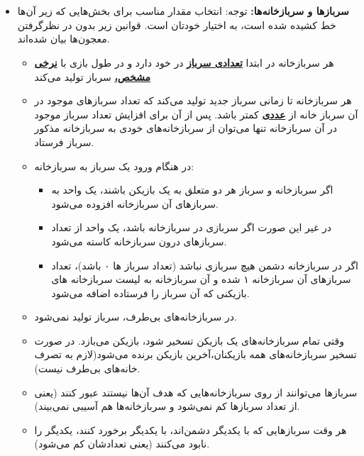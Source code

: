 \documentclass[]{article}
\begin{document}
\newpage

\section*{{}}
\begin{itemize}
    \item{ 
\textbf{سربازها و سربازخانه‌ها:
}
\newline
توجه: انتخاب مقدار مناسب برای بخش‌هایی که زیر آن‌ها خط کشیده شده است، به اختیار خودتان است.
قوانین زیر بدون در نظرگرفتن معجون‌ها بیان شده‌اند.

\begin{itemize}
    \item{
هر سربازخانه در ابتدا
\textbf{\underline{تعدادی سرباز}}
در خود دارد و در طول بازی با
\textbf{\underline{نرخی مشخص،}}
سرباز تولید می‌کند 
    }
    \item{
هر سربازخانه تا زمانی سرباز جدید تولید می‌کند که تعداد سرباز‌های موجود در آن سرباز خانه از
\textbf{\underline{عددی}}
کمتر باشد. پس از آن برای افزایش تعداد سرباز موجود در آن سربازخانه تنها ‌‌می‌توان از سربازخانه‌های خودی به سربازخانه مذکور سرباز فرستاد.
    }
    \item{
در هنگام ورود یک سرباز به سربازخانه:
    \begin{itemize}
        \item{اگر سرباز‌خانه و سرباز هر دو متعلق به یک بازیکن باشند، یک واحد به سرباز‌های آن سرباز‌خانه افزوده می‌شود.
} 
        \item{در غیر این صورت اگر سربازی در سربازخانه باشد، یک واحد از تعداد سرباز‌های درون سربازخانه کاسته می‌شود.
} 
        \item{اگر در سربازخانه دشمن هیچ سربازی نباشد (تعداد سرباز ها ۰ باشد)، تعداد سربازهای آن سربازخانه ۱ شده و آن سرباز‌خانه به لیست سرباز‌خانه های بازیکنی که آن سرباز را فرستاده اضافه می‌شود.
} 
    \end{itemize}    
    }
    \item{
در سرباز‌خانه‌های بی‌طرف، سرباز تولید نمی‌شود.
    }
    \item{
وقتی تمام سربازخانه‌های یک بازیکن تسخیر شود، بازیکن می‌بازد. در صورت تسخیر سرباز‌خانه‌های همه بازیکنان،آخرین بازیکن برنده می‌شود(لازم به تصرف خانه‌های بی‌طرف نیست).
    }
    \item{
سربازها می‌توانند از روی سربازخانه‌هایی که هدف آن‌ها نیستند عبور کنند (یعنی از تعداد سربازها کم نمی‌شود و سربازخانه‌ها هم آسیبی نمی‌بیند).
    }
    \item{
هر وقت سربازهایی که با یکدیگر دشمن‌اند، با یکدیگر برخورد کنند، یکدیگر را نابود می‌کنند (یعنی تعدادشان کم می‌شود). 
}
\end{itemize}}
\end{itemize}
\end{document}
